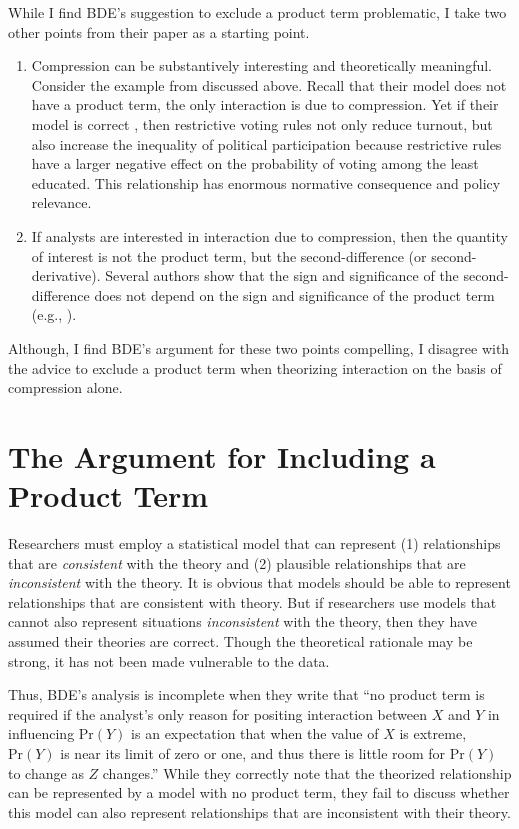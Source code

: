\documentclass[12pt]{article}
\begin{document}
\doublespace
While I find BDE's suggestion to exclude a product term problematic, I take two other points from their paper as a starting point.
\begin{enumerate}
\item Compression can be substantively interesting and theoretically meaningful. Consider the example from \cite{WolfingerRosenstone1980} discussed above. Recall that their model does not have a product term, the only interaction is due to compression. Yet if their model is correct , then restrictive voting rules not only reduce turnout, but also increase the inequality of political participation because restrictive rules have a larger negative effect on the probability of voting among the least educated. This relationship has  enormous normative consequence and policy relevance.
\item If analysts are interested in interaction due to compression, then the quantity of interest is not the product term, but the second-difference (or second-derivative). Several authors show that the sign and significance of the second-difference does not depend on the sign and significance of the product term (e.g., \citealt{TsaiGill2013, AiNorton2003}).
\end{enumerate}
 Although, I find BDE's argument for these two points compelling, I disagree with the advice to exclude a product term when theorizing interaction on the basis of compression alone.

\section*{The Argument for Including a Product Term}

Researchers must employ a statistical model that can represent (1) relationships that are \emph{consistent} with the theory and (2) plausible relationships that are \emph{inconsistent} with the theory. It is obvious that models should be able to represent relationships that are consistent with theory. But if researchers use models that cannot also represent situations \emph{inconsistent} with the theory, then they have assumed their theories are correct. Though the theoretical rationale may be strong, it has not been made vulnerable to the data.

Thus, BDE's analysis is incomplete when they write that ``no product term is required if the analyst's only reason for positing interaction between $X$ and $Y$ in influencing $\text{Pr}(Y)$ is an expectation that when the value of $X$ is extreme, $\text{Pr}(Y)$ is near its limit of zero or one, and thus there is little room for $\text{Pr}(Y)$ to change as $Z$ changes.'' While they correctly note that the theorized relationship can be represented by a model with no product term, they fail to discuss whether this model can also represent relationships that are inconsistent with their theory.
\end{document}
